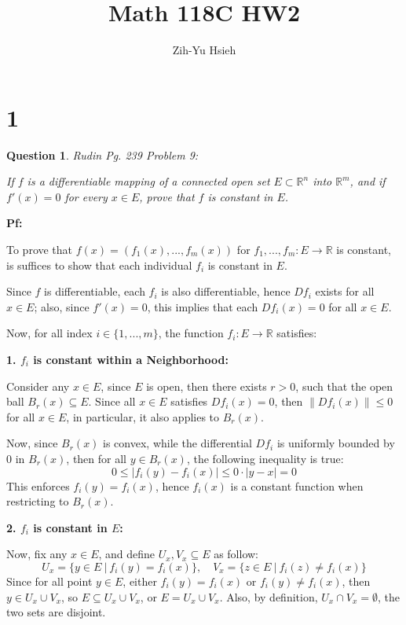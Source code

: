 \documentclass{article}
\title{Math 118C HW2}
\author{Zih-Yu Hsieh}
\newtheorem{question}{Question}
\begin{document}
\maketitle

\section*{1}
\begin{myBox}[]{}
    \begin{question}
        Rudin Pg. 239 Problem 9:

        If $f$ is a differentiable mapping of a \emph{connected} open set $E\subset \mathbb{R}^n$ into $\mathbb{R}^m$, and if $f'(x)=0$ for every $x\in E$, prove that $f$ is constant in $E$.
    \end{question}
\end{myBox}

\textbf{Pf:}

To prove that $f(x)=(f_1(x),...,f_m(x))$ for $f_1,...,f_m:E\rightarrow\mathbb{R}$ is constant, is suffices to show that each individual $f_i$ is constant in $E$.

Since $f$ is differentiable, each $f_i$ is also differentiable, hence $Df_i$ exists for all $x\in E$; also, since $f'(x)=0$, this implies that each $Df_i(x)=0$ for all $x\in E$.

Now, for all index $i\in\{1,...,m\}$, the function $f_i:E\rightarrow \mathbb{R}$ satisfies:

\hfil

\textbf{1. $f_i$ is constant within a Neighborhood:}

Consider any $x\in E$, since $E$ is open, then there exists $r>0$, such that the open ball $B_r(x)\subseteq E$.
Since all $x\in E$ satisfies $Df_i(x)=0$, then $\|Df_i(x)\|\leq 0$ for all $x\in E$, in particular, it also applies to $B_r(x)$.

Now, since $B_r(x)$ is convex, while the differential $Df_i$ is uniformly bounded by $0$ in $B_r(x)$, then for all $y\in B_r(x)$, the following inequality is true:
$$0\leq |f_i(y)-f_i(x)| \leq 0\cdot |y-x| = 0$$
This enforces $f_i(y)=f_i(x)$, hence $f_i(x)$ is a constant function when restricting to $B_r(x)$.

\hfil

\textbf{2. $f_i$ is constant in $E$:}

Now, fix any $x\in E$, and define $U_x, V_x\subseteq E$ as follow:
$$U_x=\{y\in E\ |\ f_i(y)=f_i(x)\},\quad V_x=\{z\in E\ |\ f_i(z)\neq f_i(x)\}$$
Since for all point $y\in E$, either $f_i(y)=f_i(x)$ or $f_i(y)\neq f_i(x)$, then $y\in U_x\cup V_x$, so $E\subseteq U_x\cup V_x$, or $E=U_x\cup V_x$. Also, by definition, $U_x\cap V_x = \emptyset$, the two sets are disjoint.
\end{document}

